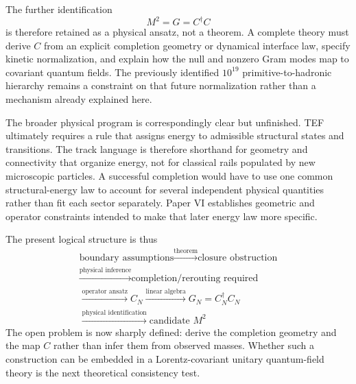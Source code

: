 \documentclass[10pt]{article}
\begin{document}
The further identification
\begin{equation}
\boxed{M^2=G=C^\dagger C}
\end{equation}
is therefore retained as a physical ansatz, not a theorem. A complete theory must derive $C$ from an explicit completion geometry or dynamical interface law, specify kinetic normalization, and explain how the null and nonzero Gram modes map to covariant quantum fields. The previously identified $10^{19}$ primitive-to-hadronic hierarchy remains a constraint on that future normalization rather than a mechanism already explained here.

The broader physical program is correspondingly clear but unfinished. TEF ultimately requires a rule that assigns energy to admissible structural states and transitions. The track language is therefore shorthand for geometry and connectivity that organize energy, not for classical rails populated by new microscopic particles. A successful completion would have to use one common structural-energy law to account for several independent physical quantities rather than fit each sector separately. Paper VI establishes geometric and operator constraints intended to make that later energy law more specific.

The present logical structure is thus
\begin{equation}
\boxed{
\begin{gathered}
\text{boundary assumptions}
\xrightarrow{\text{theorem}}
\text{closure obstruction}\\
\xrightarrow{\text{physical inference}}
\text{completion/rerouting required}\\
\xrightarrow{\text{operator ansatz}}
C_N
\xrightarrow{\text{linear algebra}}
G_N=C_N^\dagger C_N\\
\xrightarrow{\text{physical identification}}
\text{candidate }M^2
\end{gathered}
}
\label{eq:finalChain}
\end{equation}
The open problem is now sharply defined: derive the completion geometry and the map $C$ rather than infer them from observed masses. Whether such a construction can be embedded in a Lorentz-covariant unitary quantum-field theory is the next theoretical consistency test.
\end{document}

